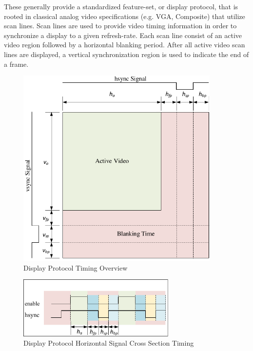     These generally provide a standardized feature-set, or display protocol, that is rooted in classical analog video specifications (e.g. VGA, Composite)\cite{NIAnalog} that utilize scan lines\cite{Neal1998}. Scan lines are used to provide video timing information in order to synchronize a display to a given refresh-rate. Each scan line consist of an active video region followed by a horizontal blanking period. After all active video scan lines are displayed, a vertical synchronization region is used to indicate the end of a frame.

    \begin{figure}
        \centering
        \includegraphics[width=0.9\textwidth]{fig/display_timing_overview.pdf}
        \caption{Display Protocol Timing Overview}
        \label{fig:display_protocol_timing_overview}
    \end{figure}

    \begin{figure}
        \centering
        \includegraphics[width=0.7\textwidth]{fig/display_timing_line_cross.pdf}
        \caption{Display Protocol Horizontal Signal Cross Section Timing}
        \label{fig:display_protocol_line_cross}
    \end{figure}

